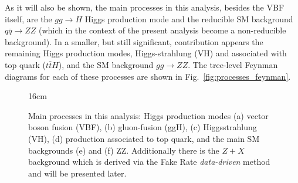 As it will also be shown, the main processes in this analysis, besides the VBF itself, are the $gg \rightarrow H$ Higgs production mode and the reducible SM background $q\bar{q} \rightarrow ZZ$ (which in the context of the present analysis become a non-reducible background). In a smaller, but still significant, contribution appears the remaining Higgs production modes, Higgs-strahlung (VH) and associated with top quark ($t\bar{t}H$), and the SM background $gg \rightarrow ZZ$. The tree-level Feynman diagrams for each of these processes are shown in Fig.~\ref{fig:processes_feynman}.

\begin{figure}[htbp]{16cm}
	\caption{Main processes in this analysis: Higgs production modes (a) vector boson fusion (VBF), (b) gluon-fusion (ggH), (c) Higgsstrahlung (VH), (d) production associated to top quark, and the main SM backgrounds (e) and (f) ZZ. Additionally there is the $Z+X$ background which is derived via the Fake Rate \textit{data-driven} method and will be presented later.}
	\centering
	\quad\quad

\end{figure}
